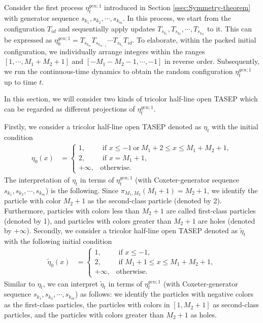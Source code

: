 \documentclass[12pt,a4paper]{amsart}
\theoremstyle{remark}
\numberwithin{equation}{section} \numberwithin{theorem}{section}
\begin{document}
Consider the first process $\eta_{t}^{gen;1}$ introduced in Section \ref{ssec:Symmetry-theorem} with generator sequence $s_{k_1}, s_{k_2}, \cdots,s_{k_m}$. In this process, we start from the configuration $T_{id}$ and sequentially apply updates $T_{s_{k_1}}, T_{s_{k_2}}, \cdots, T_{s_{k_m}}$ to it. This can be expressed as $\eta_{0}^{gen;1}=T_{s_{k_m}} T_{s_{k_{m-1}}}\cdots T_{s_{k_1}} T_{id}$. To elaborate, within the packed initial configuration, we individually arrange integers within the ranges $[1, \cdots, M_1+M_2+1]$ and $[-M_1-M_2-1, \cdots, -1]$ in reverse order. Subsequently, we run the continuous-time dynamics to obtain the random configuration $\eta_{t}^{gen;1}$ up to time $t$.

In this section, we will consider two kinds of tricolor half-line open TASEP which can be regarded as different projections of $\eta_{t}^{gen;1}$. 

Firstly, we consider a tricolor half-line open TASEP denoted as $\eta_{t}$ with the initial condition
\begin{align}
 \label{eq:eta_0}
\eta_{0}(x)&=
\begin{cases}
1, & \text{ if } x \leq -1 \ \text{or}\  M_1+2 \leq x \leq M_1+M_2+1, \\
2, & \text{ if } x=M_1+1, \\
+\infty, & \text{otherwise}.
\end{cases}
\end{align}
The interpretation of $\eta_{t}$ in terms of $\eta_{t}^{gen;1}$ (with Coxeter-generator sequence $s_{k_1}, s_{k_2}, \cdots,s_{k_m}$) is the following. Since $\pi_{M_1,M_2}(M_1+1)=M_2+1$, we identify the particle with color $M_2+1$ as the second-class particle (denoted by 2). Furthermore, particles with colors less than $M_2+1$ are called first-class particles (denoted by 1), and particles with colors greater than $M_2+1$ are holes (denoted by $+\infty$). Secondly, we consider a tricolor half-line open TASEP denoted as $\tilde{\eta}_{t}$ with the following initial condition
\begin{align}
 \label{eq:tilde-eta_0}
\tilde{\eta}_{0}(x)&=
\begin{cases}
1, & \text{ if } x \leq -1,  \\
2, & \text{ if } M_1+1 \leq x \leq M_1+M_2+1, \\
+\infty, & \text{otherwise}.
\end{cases}
\end{align}
Similar to $\eta_{t}$, we can interpret $\tilde{\eta}_{t}$ in terms of $\eta_{t}^{gen;1}$ (with Coxeter-generator sequence $s_{k_1}, s_{k_2}, \cdots,s_{k_m}$) as follows: we identify the particles with negative colors as the first-class particles, the particles with colors in $[1, M_2+1]$ as second-class particles, and the particles with colors greater than $M_2+1$ as holes. 
\end{document}

